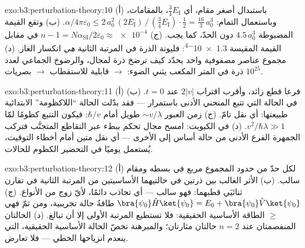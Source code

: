 \begin{solution}{exo:b3:perturbation-theory:10}
(أ) باستبدال أصغر مقام، أي $\tfrac34
E_{\text{I}}$، بالمقامات، وباستعمال التمام: $\alpha/4\pi\varepsilon_0 \le
2\,a_0^2\,(2E_{\text{I}})\,/\,(\tfrac34 E_{\text{I}})\cdot\tfrac12
= \tfrac{16}3\,a_0^3$. (ب) وتقع القيمة المضبوطة $4.5\,a_0^3$ دون
الحدّ، كما يجب. (ج) $n - 1 = N\alpha_{\text{SI}}/2\varepsilon_0
\approx \num{e-4}$ في مقابل القيمة المقيسة \num{1.3e-4}: فليونة الذرة
في المرتبة الثانية \emph{هي} انكسار الغاز. (د) مجموع عناصر
مصفوفية واحد يحدّد كيف ترضخ ذرة لمجال،
والرضوخ الجماعي لعدد $10^{25}$ ذرة في المتر المكعب يثني
الضوء:  $\to$ قابلية للاستقطاب $\to$ بصريات.
\end{solution}

\begin{solution}{exo:b3:perturbation-theory:11}
(أ) فرعا قطع زائد، وأقرب اقتراب $2|v|$ عند $t = 0$.
(ب) في الحالة التي تتبع المنحني الأدنى باستمرار --- فقد بدّلت
الحالة ``اللاكظومة'' الابتدائية طبيعتها: أي نقل تامّ. (ج) زمن العبور
$\sim v/\lambda$ طويل أمام $\hbar/v$: فيكون التتبع كظومًا لمّا
$v^2/\hbar\lambda \gg 1$. (د) في الكيوبت: امسح مجال تحكم ببطء
عبر التقاطع المتجنَّب فتركب الجمهرة الفرع الأدنى من حالة أساس إلى
الأخرى --- أي نقل متين أمام أخطاء التوقيت، يُستعمل يوميًا في
التحضير الكظوم للحالات.
\end{solution}

\begin{solution}{exo:b3:perturbation-theory:12}
(أ) لكل حدّ من حدود المجموع مربع في بسطه ومقام سالب.
(ب) الأثر الغالب بين ذرتين في حالتيهما الأساسيتين من المرتبة
الثانية في تقارن ثنائيَي قطبهما: فهو سالب --- أي تجاذب
دائمًا، لأيّ زوج من الأنواع. (ج) $\bra{\psi_0}\hat H\ket{
\psi_0} = E_0 + \bra{\psi_0}\hat V\ket{\psi_0}$ طاقةُ حالة
تجريبية، ومن ثمّ فهي $\ge$ الطاقة الأساسية الحقيقية: فلا تستطيع المرتبة الأولى
إلا أن تبالغ. (د) الحالتان المنفصمتان عند $n = 2$ حالتان
مثارتان؛ والمبرهنة تخصّ الحالة الأساسية الحقيقية، التي ينعدم
انزياحها الخطي --- فلا تعارض.
\end{solution}

